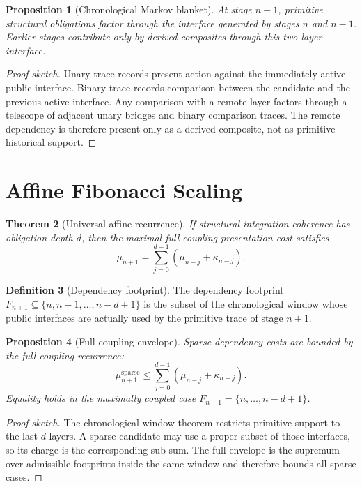 \documentclass[11pt]{article}
\theoremstyle{plain}
\newtheorem{theorem}{Theorem}[section]
\newtheorem{proposition}[theorem]{Proposition}
\theoremstyle{definition}
\newtheorem{definition}[theorem]{Definition}
\theoremstyle{remark}
\newenvironment{proofsketch}{\begin{proof}[Proof sketch]}{\end{proof}}
\begin{document}
\begin{proposition}[Chronological Markov blanket]
At stage \(n+1\), primitive structural obligations factor through the interface generated by stages \(n\) and \(n-1\). Earlier stages contribute only by derived composites through this two-layer interface.
\end{proposition}

\begin{proofsketch}
Unary trace records present action against the immediately active public interface. Binary trace records comparison between the candidate and the previous active interface. Any comparison with a remote layer factors through a telescope of adjacent unary bridges and binary comparison traces. The remote dependency is therefore present only as a derived composite, not as primitive historical support.
\end{proofsketch}

\section{Affine Fibonacci Scaling}

\begin{theorem}[Universal affine recurrence]
If structural integration coherence has obligation depth \(d\), then the maximal full-coupling presentation cost satisfies
\[
\mu_{n+1}
=
\sum_{j=0}^{d-1}(\mu_{n-j}+\kappa_{n-j}).
\]
\end{theorem}

\begin{definition}[Dependency footprint]
The dependency footprint \(F_{n+1}\subseteq\{n,n-1,\ldots,n-d+1\}\) is the subset of the chronological window whose public interfaces are actually used by the primitive trace of stage \(n+1\).
\end{definition}

\begin{proposition}[Full-coupling envelope]
Sparse dependency costs are bounded by the full-coupling recurrence:
\[
\mu_{n+1}^{\mathrm{sparse}}
\le
\sum_{j=0}^{d-1}(\mu_{n-j}+\kappa_{n-j}).
\]
Equality holds in the maximally coupled case \(F_{n+1}=\{n,\ldots,n-d+1\}\).
\end{proposition}

\begin{proofsketch}
The chronological window theorem restricts primitive support to the last \(d\) layers. A sparse candidate may use a proper subset of those interfaces, so its charge is the corresponding sub-sum. The full envelope is the supremum over admissible footprints inside the same window and therefore bounds all sparse cases.
\end{proofsketch}
\end{document}
